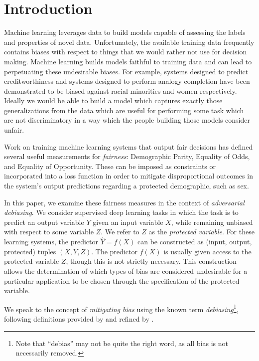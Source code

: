 \documentclass[letterpaper]{article} %
\newcommand{\incite}[1]{\citeauthor{#1} \shortcite{#1}}
\theoremstyle{definition}
\begin{document}
\section{Introduction}
Machine learning leverages data to build models capable of assessing the labels and properties of novel data.  Unfortunately, the available training data frequently contains biases with respect to things that we would rather not use for decision making.  Machine learning builds models faithful to training data and can lead to perpetuating these undesirable biases.  For example, systems designed to predict creditworthiness and systems designed to perform analogy completion have been demonstrated to be biased against racial minorities and women respectively.  Ideally we would be able to build a model which captures exactly those generalizations from the data which are useful for performing some task which are not discriminatory in a way which the people building those models consider unfair.

Work on training machine learning systems that output fair decisions has defined several useful measurements for {\it fairness}:  Demographic Parity, Equality of Odds, and Equality of Opportunity.  These can be imposed as constraints or incorporated into a loss function in order to mitigate disproportional outcomes in the system's output predictions regarding a protected demographic, such as sex.

In this paper, we examine these fairness measures in the context of {\it adversarial debiasing}.  We consider supervised deep learning tasks in which the task is to predict an output variable $Y$ given an input variable $X$, while remaining unbiased with respect to some variable $Z$.  We refer to $Z$ as the {\it protected variable}.  For these learning systems, the predictor $\hat Y = f(X)$ can be constructed as (input, output, protected) tuples $(X, Y, Z)$.
The predictor $f(X)$ is usually given access to the protected variable $Z$, though this is not strictly necessary.  This construction allows the determination of which types of bias are considered undesirable for a particular application to be chosen through the specification of the protected variable.

We speak to the concept of {\it mitigating bias} using the known term {\it debiasing}\footnote{Note that ``debias'' may not be quite the right word, as all bias is not necessarily removed.}, following definitions provided by \incite{hardt2016equality} and refined by \incite{beutel2017data}. 
\end{document}
